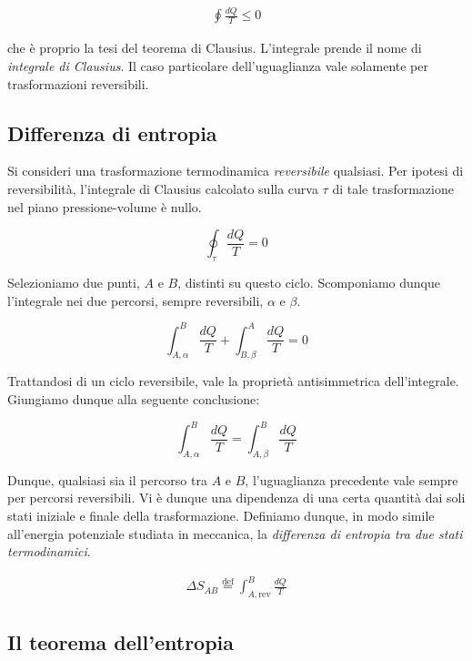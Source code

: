 \begin{align}
    \oint \frac{dQ}{T} \leq 0
\end{align}

\noindent che è proprio la tesi del teorema di Clausius. L'integrale
prende il nome di \textit{integrale di Clausius}. Il caso particolare
dell'uguaglianza vale solamente per trasformazioni reversibili.

\subsection{Differenza di entropia}
Si consideri una trasformazione termodinamica \textit{reversibile} qualsiasi.
Per ipotesi di reversibilità, l'integrale di Clausius calcolato sulla curva $\tau$
di tale trasformazione nel piano pressione-volume è nullo.

\[ \oint_\tau \frac{dQ}{T} = 0 \]

\noindent Selezioniamo due punti, $A$ e $B$, distinti su questo ciclo. Scomponiamo
dunque l'integrale nei due percorsi, sempre reversibili, $\alpha$ e $\beta$.

\[ \int_{A,\alpha}^{B} \frac{dQ}{T} + \int_{B,\beta}^{A} \frac{dQ}{T} = 0 \]

\noindent Trattandosi di un ciclo reversibile, vale la proprietà antisimmetrica
dell'integrale. Giungiamo dunque alla seguente conclusione:

\[ \int_{A,\alpha}^{B} \frac{dQ}{T} = \int_{A,\beta}^{B} \frac{dQ}{T} \]

\noindent Dunque, qualsiasi sia il percorso tra $A$ e $B$, l'uguaglianza
precedente vale sempre per percorsi reversibili. Vi è dunque una dipendenza
di una certa quantità dai soli stati iniziale e finale della trasformazione.
Definiamo dunque, in modo simile all'energia potenziale studiata in meccanica,
la \textit{differenza di entropia tra due stati termodinamici}.

\begin{align}
    \Delta S_{AB} \stackrel{\text{def}}{=} \int_{A,\text{rev}}^{B} \frac{dQ}{T}
\end{align}


\subsection{Il teorema dell'entropia}









